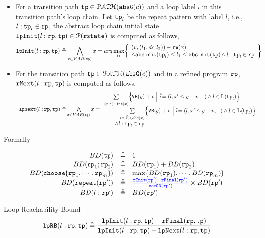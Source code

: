 \begin{defn}
\begin{itemize}
   \item For a transition path $\mathtt{tp} \in \mathcal{PATH}(\mathtt{abs}{\mathtt{G}}(c))$ and a loop label $l$ in this transition path's loop chain.
Let $\mathtt{tp}_l$ be the repeat pattern with label $l$, i.e., $l: \mathtt{tp}_l \in \mathtt{rp}$, 
the abstract loop chain initial state $\mathtt{lpInit}(l: \mathtt{rp}, \mathtt{tp}) \in \mathcal{P}(\mathtt{rstate})$ is computed as follows,
\[
  \lpinit(l: \rprog, \tpath) \triangleq 
  \bigwedge_{x \in VAR(\tpath)}
  x = arg\max_{l_1}
  \left\{
      \begin{array}{l}
    (v, (l_1, dc, l_2)) \in \reset(x) 
        \\ 
    \land \absinit(\tpath_l) \leq l_1 \leq \absinit(\tpath)
    \land l: \tpath_l \in \rprog
    \end{array}
    \right\}
  \]
\item
For the transition path $\mathtt{tp} \in \mathcal{PATH}(\mathtt{abs}{\mathtt{G}}(c))$ and in a refined program $\mathtt{rp}$,
$\mathtt{rNext}(l: \mathtt{rp}, \mathtt{tp})$ is computed as follows,
%
\[
  \begin{array}{l}
  \lpnext(l: \rprog, \tpath) \triangleq 
  \bigwedge\limits_{x \in VAR(\tpath)}
    x =   
    \begin{array}{l}
  \sum\limits_{(x, \absevent) \in \inc(x) }\left\{ 
    \varinvar(y) + v ~\middle\vert~ \absevent = (l, x' \leq y + v, \_) \land l \in \lvar(\tpath_l)\right\}
    \\ \qquad 
    - \sum\limits_{(x, \absevent) \in dec(x) }\left\{ 
      \varinvar(y) + v 
      ~\middle\vert~ \absevent = (l, x' \leq y + v, \_) \land l \in \lvar(\tpath_l) \right\}
      \\
      \qquad 
      \land l: \tpath_l \in \rprog
    \end{array}
  \end{array}
\]
    \end{itemize}
\end{defn}

Formally
\begin{defn}
\label{def:loopbound}
\[
  \begin{array}{rcl}
    BD(\tpath) & \triangleq & 1 \\
    BD(\rprog_1;\rprog_2) & \triangleq & BD(\rprog_1) + BD(\rprog_2) \\
    BD(\rpchoose{\rprog_1, \cdots, \rprog_m }) & \triangleq 
    & \max\left\{ BD(\rprog_1), \cdots, BD(\rprog_m) \right\} \\
    BD(\rprepeat(\rprog')) & \triangleq 
    &
    \highlight{\frac{\rfinit(\rprog') - \rffinal(\rprog')}{\varGD(\rprog')}}
     \times BD(\rprog')
     \\
    BD(l: \rprog') & \triangleq & BD(\rprog')
  \end{array}
  \]
\end{defn}

\begin{defn}
  \label{def:looprb}
  Loop Reachability Bound
  \[
    \mathtt{lpRB}(l: \mathtt{rp}, \mathtt{tp}) \triangleq
      \frac{\mathtt{lpInit}(l: \mathtt{rp}, \mathtt{tp}) - \mathtt{rFinal}(\mathtt{rp}, \mathtt{tp})}{\mathtt{lpInit}(l: \mathtt{rp}, \mathtt{tp}) - \mathtt{lpNext}(l: \mathtt{rp}, \mathtt{tp})}
  \]
\end{defn}